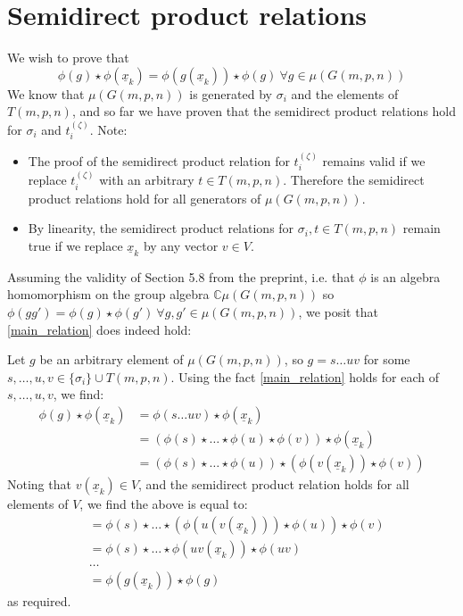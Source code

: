 \documentclass[11pt]{article}
\title{}
\author{Ted Jones-Healey}
\date{}
\newcommand{\bb}{\medbreak}
\newcommand{\nt}{\noindent}
\newcommand{\Cc}{\mathbb{C}}
\newcommand{\ux}{\underline{x}}
\theoremstyle{definition}
\begin{document}
\section{Semidirect product relations}
We wish to prove that 
\begin{equation}\label{main_relation}
  \phi(g)\star \phi(\ux_k)=\phi(g(\ux_k))\star \phi(g)\ \forall g\in \mu(G(m,p,n))
\end{equation}
We know that $\mu(G(m,p,n))$ is generated by $\sigma_i$ and the elements of $T(m,p,n)$, and so far we have proven that the semidirect product relations hold for $\sigma_i$ and $t_i^{(\zeta)}$. Note:
\begin{itemize}
  \item The proof of the semidirect product relation for $t_i^{(\zeta)}$ remains valid if we replace $t_i^{(\zeta)}$ with an arbitrary $t\in T(m,p,n)$. Therefore the semidirect product relations hold for all generators of $\mu(G(m,p,n))$. 
  \item By linearity, the semidirect product relations for $\sigma_i, t\in T(m,p,n)$ remain true if we replace $\ux_k$ by any vector $v\in V$.
\end{itemize}
Assuming the validity of Section 5.8 from the preprint, i.e. that $\phi$ is an algebra homomorphism on the group algebra $\Cc \mu(G(m,p,n))$ so $\phi(gg')=\phi(g)\star \phi(g')\ \forall g,g'\in \mu(G(m,p,n))$, we posit that \eqref{main_relation} does indeed hold:\bb

\nt Let $g$ be an arbitrary element of $\mu(G(m,p,n))$, so $g=s\dots uv$ for some $s,\dots,u,v\in \{\sigma_i\}\cup T(m,p,n)$. Using the fact \eqref{main_relation} holds for each of $s,\dots, u,v$, we find:
\begin{align*}
\phi(g)\star \phi(\ux_k) & =\phi(s\dots uv)\star \phi(\ux_k)\\
  & = (\phi(s)\star \dots \star \phi(u) \star \phi(v))\star \phi(\ux_k)\\
  & = (\phi(s)\star \dots \star \phi(u)) \star (\phi(v(\ux_k))\star \phi(v))
\end{align*}
Noting that $v(\ux_k)\in V$, and the semidirect product relation holds for all elements of $V$, we find the above is equal to:
\begin{align*}
 &= \phi(s)\star \dots \star (\phi(u(v(\ux_k)))\star \phi(u)) \star \phi(v)\\
 &= \phi(s)\star \dots \star \phi(uv(\ux_k))\star \phi(uv)\\
 &\dots\\
 & =\phi(g(\ux_k))\star \phi(g)
\end{align*}
as required.




%
%
\end{document}
